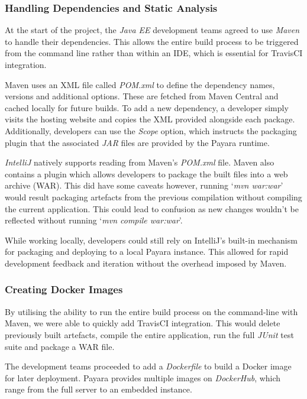 \subsubsection{Handling Dependencies and Static Analysis}
At the start of the project, the \textit{Java EE} development teams agreed to use \textit{Maven}\cite{Maven} to handle their dependencies. This allows the entire build process to be triggered from the command line rather than within an IDE, which is essential for TravisCI integration.

Maven uses an XML file called \textit{POM.xml} to define the dependency names, versions and additional options. These are fetched from Maven Central and cached locally for future builds. To add a new dependency, a developer simply visits the hosting website and copies the XML provided alongside each package. Additionally, developers can use the \textit{Scope} option, which instructs the packaging plugin that the associated \textit{JAR} files are provided by the Payara runtime.

\textit{IntelliJ} natively supports reading from Maven's \textit{POM.xml} file. Maven also contains a plugin which allows developers to package the built files into a web archive (WAR). This did have some caveats however, running `\textit{mvn war:war}' would result packaging artefacts from the previous compilation without compiling the current application. This could lead to confusion as new changes wouldn't be reflected without running `\textit{mvn compile war:war}'.

While working locally, developers could still rely on IntelliJ's built-in mechanism for packaging and deploying to a local Payara instance. This allowed for rapid development feedback and iteration without the overhead imposed by Maven.

\subsubsection{Creating Docker Images}
By utilising the ability to run the entire build process on the command-line with Maven, we were able to quickly add TravisCI integration. This would delete previously built artefacts, compile the entire application, run the full \textit{JUnit} test suite and package a WAR file.

The development teams proceeded to add a \textit{Dockerfile} to build a Docker image for later deployment. Payara provides multiple images on \textit{DockerHub}\cite{DockerHub_Payara}, which range from the full server to an embedded instance.

